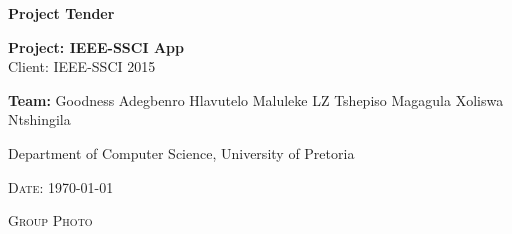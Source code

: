 \begin{titlepage}
	\begin{center}
		
		\textbf{\huge Project Tender } \\
		\vfill

		\textbf{\large Project: IEEE-SSCI App} \\
		{\large Client: IEEE-SSCI 2015 } \\ 
		
		
		\begin{flushright} \large
			\textbf{Team:}\newline
			Goodness Adegbenro\newline
			Hlavutelo Maluleke\newline
			LZ\newline
			Tshepiso Magagula\newline
			Xoliswa Ntshingila\newline
		\end{flushright}
		{\large Department of Computer Science, University of Pretoria } \\ 
		
	

		\vfill

		

		\textsc{\large Date: \today}	

		\vfill
	
		\textsc{\large Group Photo } \\ 	
		
		
	\end{center}
\end{titlepage}
